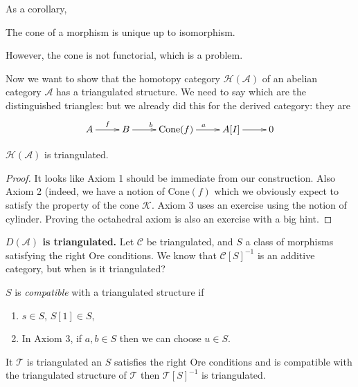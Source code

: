 As a corollary,

\begin{corollary}
\label{lemma-cone-of-morphism-is-unique}
The cone of a morphism is unique up to
isomorphism.
\end{corollary}

However, the cone is not functorial, which is
a problem.

\medskip\noindent
Now we want to show that the homotopy
category $\mathcal{H}(\mathcal{A})$ of an
abelian category $\mathcal{A}$ has a
triangulated structure. We need to say which
are the distinguished triangles: but we
already did this for the derived category:
they are
$$
\xymatrix{
A\ar[r]^f&B\ar[r]^b&\text{Cone}(f)\ar[r]^a&
A[I]\ar[r]&0
}
$$

\begin{theorem}
\label{dcos-label-015}
$\mathcal{H}(\mathcal{A})$ is triangulated.
\end{theorem}

\begin{proof}
It looks like Axiom 1 should be immediate
from our construction. Also Axiom 2 (indeed,
we have a notion of $\text{Cone}(f)$ which we
obviously expect to satisfy the property of
the cone $\mathcal{K}$. Axiom 3 uses an
exercise using the notion of cylinder.
Proving the octahedral axiom is also an
exercise with a big hint.
\end{proof}

{\bf $D(\mathcal{A})$ is triangulated.} Let
$\mathcal{C}$ be triangulated, and $S$ a
class of morphisms satisfying the right Ore
conditions. We know that
$\mathcal{C}[S]^{-1}$ is an additive
category, but when is it triangulated?

\begin{definition}
\label{dcos-label-016}
$S$ is {\it compatible} with a triangulated
structure if
\begin{enumerate}
\item $s \in S$, $S[1]\in S$,
\item In Axiom 3, if $a,b \in S$ then we can
choose $u \in S$.
\end{enumerate}
\end{definition}

\begin{proposition}
\label{dcos-label-017}
It $\mathcal{T}$ is triangulated an $S$
satisfies the right Ore conditions and is
compatible with the triangulated structure of
$\mathcal{T}$ then $\mathcal{T}[S]^{-1}$ is
triangulated.
\end{proposition}

